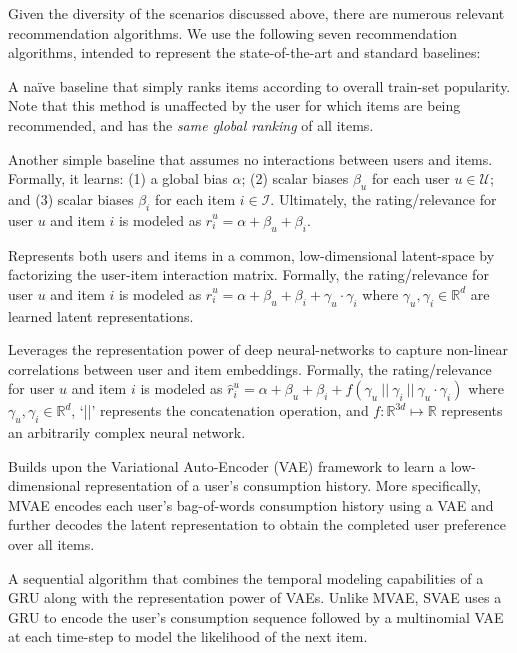 Given the diversity of the scenarios discussed above, there are numerous relevant recommendation algorithms. We use the following seven recommendation algorithms, intended to represent the state-of-the-art and standard baselines:
\begin{itemize}
     A na\"ive baseline that simply ranks items according to overall train-set popularity. Note that this method is unaffected by the user for which items are being recommended, and has the \emph{same global ranking} of all items.
    
     Another simple baseline that assumes no interactions between users and items. Formally, it learns: (1) a global bias $\alpha$; (2) scalar biases $\beta_u$ for each user $u \in \mathcal{U}$; and (3) scalar biases $\beta_i$ for each item $i \in \mathcal{I}$. Ultimately, the rating/relevance for user $u$ and item $i$ is modeled as $\hat{r}^u_i = \alpha + \beta_u + \beta_i$.

     Represents both users and items in a common, low-dimensional latent-space by factorizing the user-item interaction matrix. Formally, the rating/relevance for user $u$ and item $i$ is modeled as $\hat{r}^u_i = \alpha + \beta_u + \beta_i + \gamma_u \cdot \gamma_i$ where $\gamma_u, \gamma_i \in \mathbb{R}^d$ are learned latent representations. 
    
     Leverages the representation power of deep neural-networks to capture non-linear correlations between user and item embeddings. Formally, the rating/relevance for user $u$ and item $i$ is modeled as $\hat{r}^u_i = \alpha + \beta_u + \beta_i + f(\gamma_u ~||~ \gamma_i ~||~ \gamma_u \cdot \gamma_i)$ where $\gamma_u, \gamma_i \in \mathbb{R}^d$, `||' represents the concatenation operation, and $f : \mathbb{R}^{3d} \mapsto \mathbb{R}$ represents an arbitrarily complex neural network. 
    
     Builds upon the Variational Auto-Encoder (VAE) \cite{vae} framework to learn a low-dimensional representation of a user's consumption history. More specifically, MVAE encodes each user's bag-of-words consumption history using a VAE and further decodes the latent representation to obtain the completed user preference over all items.
    
     A sequential algorithm that combines the temporal modeling capabilities of a GRU \cite{gru} along with the representation power of VAEs. Unlike MVAE, SVAE uses a GRU to encode the user's consumption sequence followed by a multinomial VAE at each time-step to model the likelihood of the next item. 
    

\end{itemize}
